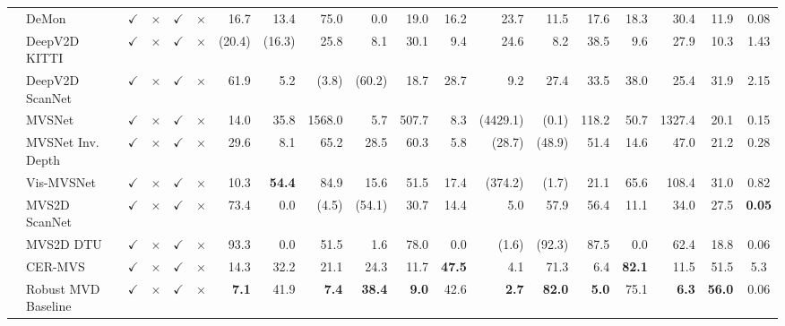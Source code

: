 \begin{table}
\begin{center}
{\begin{tabular}{llccccrrrrrrrrrrrrc}
\hline

\multirow{10}{*}{} & DeMon~\cite{ummenhofer2017demon} & $\checkmark$ & $\times$ &$\checkmark$ & $\times$ & 16.7 & 13.4 & 75.0 & 0.0 & 19.0 & 16.2 & 23.7 & 11.5 & 17.6 & 18.3 & 30.4 & 11.9 & 0.08  \\
& DeepV2D KITTI~\cite{teed2020deepv2d} & $\checkmark$ & $\times$ &$\checkmark$ & $\times$ & (20.4) & (16.3) & 25.8 & 8.1 & 30.1 & 9.4 & 24.6 & 8.2 & 38.5 & 9.6 & 27.9 & 10.3  & 1.43\\
& DeepV2D ScanNet~\cite{teed2020deepv2d}\ & $\checkmark$ & $\times$ &$\checkmark$ & $\times$ & 61.9 & 5.2 & (3.8) & (60.2) & 18.7 & 28.7 & 9.2 & 27.4 & 33.5 & 38.0 & 25.4 & 31.9  & 2.15 \\
& MVSNet~\cite{yao2018mvsnet} & $\checkmark$ & $\times$ &$\checkmark$ & $\times$ & 14.0 & 35.8 & 1568.0 & 5.7 & 507.7 & 8.3 & (4429.1) & (0.1) & 118.2 & 50.7 & 1327.4 & 20.1 & 0.15 \\
& MVSNet Inv. Depth~\cite{yao2018mvsnet} & $\checkmark$ & $\times$ &$\checkmark$ & $\times$ & 29.6 & 8.1 & 65.2 & 28.5 & 60.3 & 5.8 & (28.7) & (48.9) & 51.4 & 14.6 & 47.0 & 21.2 & 0.28  \\
& Vis-MVSNet \cite{zhang2020visibility} & $\checkmark$ & $\times$ &$\checkmark$ & $\times$ & 10.3 &{\bf 54.4}& 84.9 & 15.6 & 51.5 & 17.4 & (374.2) & (1.7) & 21.1 & 65.6 & 108.4 & 31.0 &0.82 \\
& MVS2D ScanNet~\cite{yang2022mvs2d} & $\checkmark$ &$\times$ &$\checkmark$ &$\times$ & 73.4 & 0.0 & (4.5) & (54.1) & 30.7 & 14.4 & 5.0 & 57.9 & 56.4 & 11.1 & 34.0 & 27.5 & \textbf{0.05}  \\
& MVS2D DTU~\cite{yang2022mvs2d} &$\checkmark$ & $\times$ & $\checkmark$ & $\times$ & 93.3 & 0.0 & 51.5 & 1.6 & 78.0 & 0.0 & (1.6) & (92.3) & 87.5 & 0.0 & 62.4 & 18.8 & 0.06 \\
& CER-MVS~\cite{cermvs} & $\checkmark$ & $\times$ & $\checkmark$ & $\times$ & 14.3 & 32.2 & 21.1 & 24.3 & 11.7 & \bf 47.5 &  4.1 & 71.3 &  6.4 & \bf 82.1 & 11.5 & 51.5 & 5.3 \\
& Robust MVD Baseline~\cite{schroppel2022benchmark} &$\checkmark$&$\times$&$\checkmark$&$\times$ &{\bf 7.1} & 41.9 & {\bf 7.4}&{\bf 38.4}&{\bf 9.0}&{ 42.6}&{\bf 2.7}&{\bf 82.0}&{\bf 5.0}&{ 75.1}&{\bf 6.3} &{\bf 56.0} & 0.06\\

\hline


\end{tabular}}
\end{center}
\end{table}
